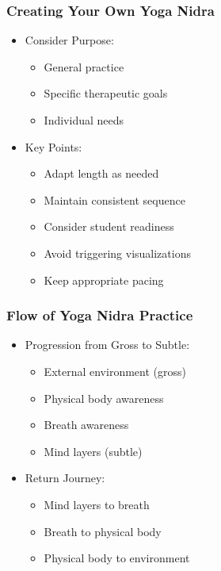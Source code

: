 \begin{frame}[fragile]\frametitle{Creating Your Own Yoga Nidra}
    \begin{itemize}
        \item Consider Purpose:
            \begin{itemize}
                \item General practice
                \item Specific therapeutic goals
                \item Individual needs
            \end{itemize}
        \item Key Points:
            \begin{itemize}
                \item Adapt length as needed
                \item Maintain consistent sequence
                \item Consider student readiness
                \item Avoid triggering visualizations
                \item Keep appropriate pacing
            \end{itemize}
    \end{itemize}
\end{frame}


\begin{frame}[fragile]\frametitle{Flow of Yoga Nidra Practice}
    \begin{itemize}
        \item Progression from Gross to Subtle:
            \begin{itemize}
                \item External environment (gross)
                \item Physical body awareness
                \item Breath awareness
                \item Mind layers (subtle)
            \end{itemize}
        \item Return Journey:
            \begin{itemize}
                \item Mind layers to breath
                \item Breath to physical body
                \item Physical body to environment
            \end{itemize}
    \end{itemize}
\end{frame}


